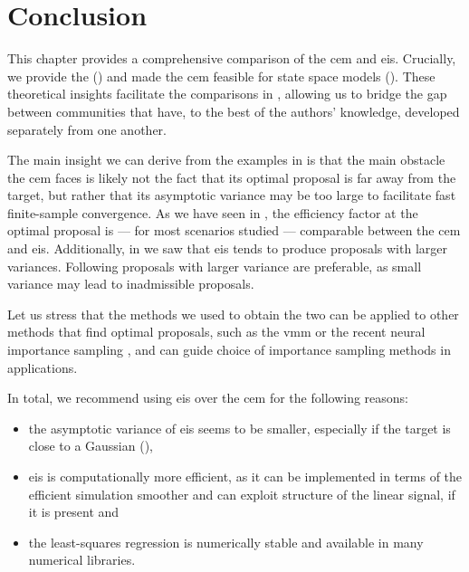 \section{Conclusion}
\label{sec:03_conclusion}

This chapter provides a comprehensive comparison of the \acrshort{cem} and \acrshort{eis}. Crucially, we provide the   () and made the \acrshort{cem} feasible for state space models (). These theoretical insights facilitate the comparisons in , allowing us to bridge the gap between communities that have, to the best of the authors' knowledge, developed separately from one another.

The main insight we can derive from the examples in  is that the main obstacle the \acrshort{cem} faces is likely not the fact that its optimal proposal is far away from the target, but rather that its asymptotic variance may be too large to facilitate fast finite-sample convergence. As we have seen in , the efficiency factor at the optimal proposal is --- for most scenarios studied --- comparable between the \acrshort{cem} and \acrshort{eis}. Additionally, in  we saw that \acrshort{eis} tends to produce proposals with larger variances. Following  proposals with larger variance are preferable, as small variance may lead to inadmissible proposals.

Let us stress that the methods we used to obtain the two  can be applied to other methods that find optimal proposals, such as the \acrshort{vmm} or the recent neural importance sampling \citep{Muller2019Neural}, and can guide choice of importance sampling methods in applications.

In total, we recommend using \acrshort{eis} over the \acrshort{cem} for the following reasons:
\begin{itemize}
    \item the asymptotic variance of \acrshort{eis} seems to be smaller, especially if the target is close to a Gaussian (),
    \item \acrshort{eis} is computationally more efficient, as it can be implemented in terms of the efficient simulation smoother and can exploit structure of the linear signal, if it is present and
    \item the least-squares regression is numerically stable and available in many numerical libraries.
\end{itemize}